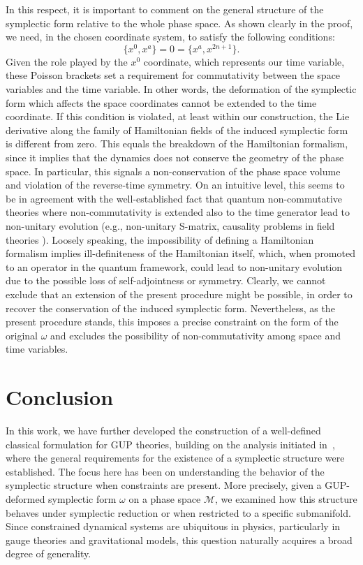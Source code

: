 \documentclass{article}
\numberwithin{equation}{section}
\theoremstyle{definition}
\begin{document}
In this respect, it is important to comment on the general structure of the symplectic form relative to the whole phase space.  
As shown clearly in the proof, we need, in the chosen coordinate system, to satisfy the following conditions:
\[
    \{x^0, x^a\} = 0 = \{x^a, x^{2n+1}\}.
\]
Given the role played by the \(x^0\) coordinate, which represents our time variable, these Poisson brackets set a requirement for commutativity between the space variables and the time variable.  
In other words, the deformation of the symplectic form which affects the space coordinates cannot be extended to the time coordinate.  
If this condition is violated, at least within our construction, the Lie derivative along the family of Hamiltonian fields of the induced symplectic form is different from zero.  
This equals the breakdown of the Hamiltonian formalism, since it implies that the dynamics does not conserve the geometry of the phase space.  
In particular, this signals a non-conservation of the phase space volume and violation of the reverse-time symmetry.  
On an intuitive level, this seems to be in agreement with the well-established fact that quantum non-commutative theories where non-commutativity is extended also to the time generator lead to non-unitary evolution (e.g., non-unitary S-matrix, causality problems in field theories \cite{gomis2000space, salminen2011noncommutative, chu2002hermitian, balachandran2004unitary}).  
Loosely speaking, the impossibility of defining a Hamiltonian formalism implies ill-definiteness of the Hamiltonian itself, which, when promoted to an operator in the quantum framework, could lead to non-unitary evolution due to the possible loss of self-adjointness or symmetry.  
Clearly, we cannot exclude that an extension of the present procedure might be possible, in order to recover the conservation of the induced symplectic form. Nevertheless, as the present procedure stands, this imposes a precise constraint on the form of the original \(\omega\) and excludes the possibility of non-commutativity among space and time variables.

\section{Conclusion} \label{Concl}
In this work, we have further developed the construction of a well-defined classical formulation for GUP theories, building on the analysis initiated in~\cite{Bruno_Segreto_2024}, where the general requirements for the existence of a symplectic structure were established. The focus here has been on understanding the behavior of the symplectic structure when constraints are present.
More precisely, given a GUP-deformed symplectic form $\omega$ on a phase space $\mathcal{M}$, we examined how this structure behaves under symplectic reduction or when restricted to a specific submanifold. Since constrained dynamical systems are ubiquitous in physics, particularly in gauge theories and gravitational models, this question naturally acquires a broad degree of generality.
\end{document}
